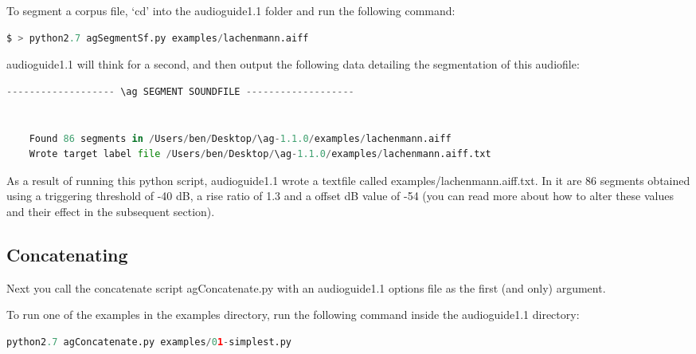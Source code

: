 \documentclass{article}
\newcommand{\ag}{audioguide1.1 }
\begin{document}
\begin{spacing}{1.2}
To segment a corpus file, `cd' into the \ag folder and run the following command:

\begin{lstlisting}[language=python]
$ > python2.7 agSegmentSf.py examples/lachenmann.aiff
\end{lstlisting}

\ag will think for a second, and then output the following data detailing the segmentation of this audiofile:

\begin{lstlisting}[language=python]
------------------- \ag SEGMENT SOUNDFILE -------------------


	Found 86 segments in /Users/ben/Desktop/\ag-1.1.0/examples/lachenmann.aiff
	Wrote target label file /Users/ben/Desktop/\ag-1.1.0/examples/lachenmann.aiff.txt
\end{lstlisting}

As a result of running this python script, \ag wrote a textfile called examples/lachenmann.aiff.txt.  In it are 86 segments obtained using a triggering threshold of -40 dB, a rise ratio of 1.3 and a offset dB value of -54 (you can read more about how to alter these values and their effect in the subsequent section).

\subsection{Concatenating}
Next you call the concatenate script agConcatenate.py with an \ag options file as the first (and only) argument.  

To run one of the examples in the examples directory, run the following command inside the \ag directory:
\begin{lstlisting}[language=python]
python2.7 agConcatenate.py examples/01-simplest.py
\end{lstlisting}


\end{spacing}
\end{document}
